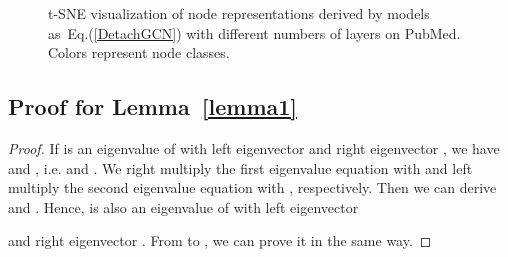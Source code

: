 \documentclass[sigconf]{acmart}
\begin{document}
\begin{figure*}
\centering
{}
\caption{t-SNE visualization of node representations derived by models as~Eq.(\ref{DetachGCN}) with different numbers of layers on PubMed. Colors represent node classes.}
\label{fig:tsne2_pubmed}
\end{figure*}


\subsection{Proof for Lemma~\ref{lemma1}}\label{Sec:proof1}

\begin{proof}
If  is an eigenvalue of
 with left eigenvector
 and right eigenvector ,
we have  and
,
i.e. 
and
.
We right multiply the first eigenvalue equation with
 and left multiply
the second eigenvalue equation with
, respectively.
Then we can derive  and
.
Hence,  is also an eigenvalue of
 with left eigenvector

and right eigenvector
.
From  to
, we can prove it in the
same way.
\end{proof}
\end{document}

